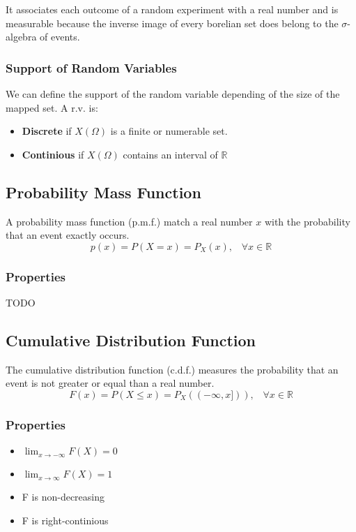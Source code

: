 It associates each outcome of a random experiment with a real number and is measurable because the inverse image of every borelian 
set does belong to the $\sigma$-algebra of events.

\subsubsection{Support of Random Variables}
We can define the support of the random variable depending of the size of the mapped set. A r.v. is:
\begin{itemize}
    \item \textbf{Discrete} if $X(\Omega)$ is a finite or numerable set.
    \item \textbf{Continious} if $X(\Omega)$ contains an interval of $\mathbb{R}$
\end{itemize}

\subsection{Probability Mass Function}
A probability mass function (p.m.f.) match a real number $x$ with the probability that an event exactly occurs.
\[ p(x)=P(X=x)=P_X(x),\;\;\; \forall x\in \mathbb{R} \]

\subsubsection{Properties}
TODO

\subsection{Cumulative Distribution Function}
The cumulative distribution function (c.d.f.) measures the probability that an event is not greater or equal than a real number.
\[ F(x) = P(X\leq x) = P_X((-\infty,x])),\;\;\; \forall x \in \mathbb{R} \]

\subsubsection{Properties}
\begin{itemize}
    \item $\lim_{x \rightarrow -\infty} F(X) = 0$
    \item $\lim_{x \rightarrow \infty} F(X) = 1$
    \item F is non-decreasing
    \item F is right-continious
\end{itemize}

